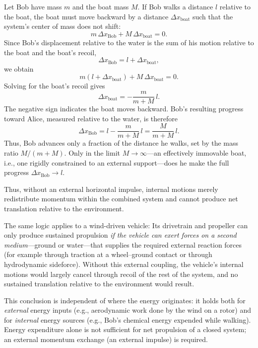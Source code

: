 \documentclass[a4paper]{article}
\begin{document}
Let Bob have mass $m$ and the boat mass $M$. If Bob walks a distance $l$ relative to the boat, the boat must move backward by a distance $\Delta x_\text{boat}$ such that the system's center of mass does not shift:
\begin{equation}
m\,\Delta x_\text{Bob} + M\,\Delta x_\text{boat} = 0.
\end{equation}
Since Bob's displacement relative to the water is the sum of his motion relative to the boat and the boat's recoil,
\begin{equation}
\Delta x_\text{Bob} = l + \Delta x_\text{boat},
\end{equation}
we obtain
\begin{equation}
m(l + \Delta x_\text{boat}) + M\,\Delta x_\text{boat} = 0.
\end{equation}
Solving for the boat's recoil gives
\begin{equation}
\Delta x_\text{boat} = -\frac{m}{m+M}\,l.
\end{equation}
The negative sign indicates the boat moves backward. Bob's resulting progress toward Alice, measured relative to the water, is therefore
\begin{equation}
\Delta x_\text{Bob} = l - \frac{m}{m+M}\,l = \frac{M}{m+M}\,l.
\end{equation}
Thus, Bob advances only a fraction of the distance he walks, set by the mass ratio \(M/(m+M)\). Only in the limit \(M\to\infty\)---an effectively immovable boat, i.e., one rigidly constrained to an external support---does he make the full progress \(\Delta x_\text{Bob}\to l\).

Thus, without an external horizontal impulse, internal motions merely
redistribute momentum within the combined system and cannot produce net
translation relative to the environment.

The same logic applies to a wind-driven vehicle: Its drivetrain and propeller
can only produce sustained propulsion \emph{if the vehicle can exert forces on
a second medium}---ground or water---that supplies the required external
reaction forces (for example through traction at a wheel--ground contact or
through hydrodynamic sideforce). Without this external coupling, the vehicle's
internal motions would largely cancel through recoil of the rest of the system,
and no sustained translation relative to the environment would result.

This conclusion is independent of where the energy originates: it holds both
for \emph{external} energy inputs (e.g., aerodynamic work done by the wind on a
rotor) and for \emph{internal} energy sources (e.g., Bob's chemical energy
expended while walking). Energy expenditure alone is not sufficient for net
propulsion of a closed system; an external momentum exchange (an external
impulse) is required.
\end{document}
